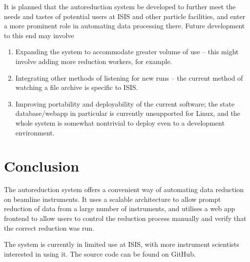 \documentclass[twocolumn]{article}
\begin{document}
It is planned that the autoreduction system be developed to further meet
the needs and tastes of potential users at ISIS and other particle
facilities, and enter a more prominent role in automating data
processing there. Future development to this end may involve

\begin{enumerate}
\item
  Expanding the system to accommodate greater volume of use -- this
  might involve adding more reduction workers, for example.
\item
  Integrating other methods of listening for new runs -- the current
  method of watching a file archive is specific to ISIS.
\item
  Improving portability and deployability of the current software; the
  state database/webapp in particular is currently unsupported for
  Linux, and the whole system is somewhat nontrivial to deploy even to a
  development environment.
\end{enumerate}

\section{Conclusion}\label{conclusion}

The autoreduction system offers a convenient way of automating data reduction
on beamline instruments. It uses a scalable architecture to allow prompt
reduction of data from a large number of instruments, and utilises a web app
frontend to allow users to control the reduction process manually and verify
that the correct reduction was run.

The system is currently in limited use at ISIS, with more instrument scientists
interested in using it. The source code can be found on GitHub\cite{source}.
\end{document}
